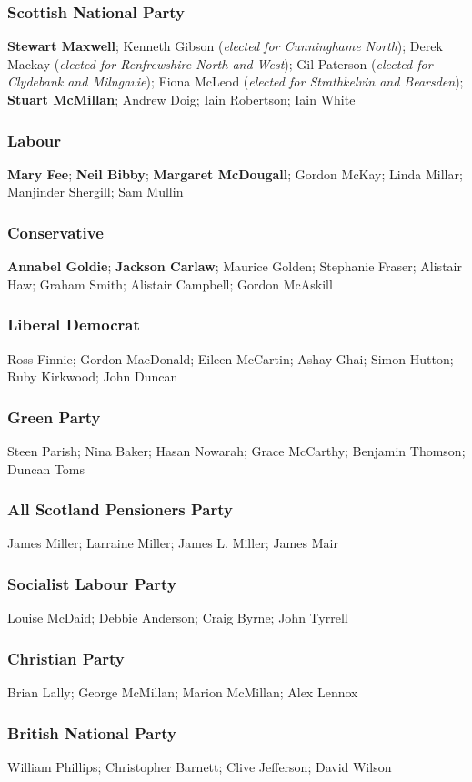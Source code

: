 \begin{resultsiii}
\subsubsection*{Scottish National Party}
\textbf{Stewart Maxwell}; Kenneth Gibson (\emph{elected for Cunninghame North}); Derek Mackay (\emph{elected for Renfrewshire North and West}); Gil Paterson (\emph{elected for Clydebank and Milngavie}); Fiona McLeod (\emph{elected for Strathkelvin and Bearsden}); \textbf{Stuart McMillan}; Andrew Doig; Iain Robertson; Iain White
\subsubsection*{Labour}
\textbf{Mary Fee}; \textbf{Neil Bibby}; \textbf{Margaret McDougall}; Gordon McKay; Linda Millar; Manjinder Shergill; Sam Mullin
\subsubsection*{Conservative}
\textbf{Annabel Goldie}; \textbf{Jackson Carlaw}; Maurice Golden; Stephanie Fraser; Alistair Haw; Graham Smith; Alistair Campbell; Gordon McAskill
\subsubsection*{Liberal Democrat}
Ross Finnie; Gordon MacDonald; Eileen McCartin; Ashay Ghai; Simon Hutton; Ruby Kirkwood; John Duncan
\subsubsection*{Green Party}
Steen Parish; Nina Baker; Hasan Nowarah; Grace McCarthy; Benjamin Thomson; Duncan Toms
\subsubsection*{All Scotland Pensioners Party}
James Miller; Larraine Miller; James L. Miller; James Mair
\subsubsection*{Socialist Labour Party}
Louise McDaid; Debbie Anderson; Craig Byrne; John Tyrrell
\subsubsection*{Christian Party}
Brian Lally; George McMillan; Marion McMillan; Alex Lennox
\subsubsection*{British National Party}
William Phillips; Christopher Barnett; Clive Jefferson; David Wilson

\end{resultsiii}
